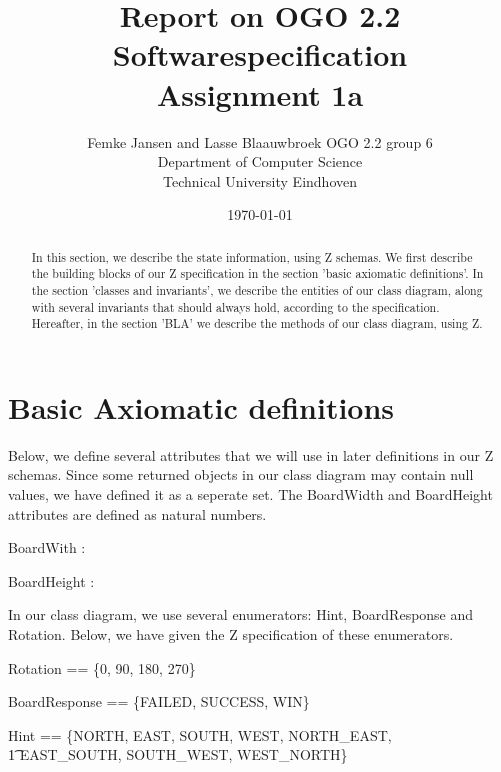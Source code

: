 \documentclass[12pt]{article}
\title{Report on OGO 2.2 Softwarespecification\\ Assignment 1a}
\author{
        Femke Jansen and Lasse Blaauwbroek OGO 2.2 group 6 \\
                Department of Computer Science\\
        Technical University Eindhoven\\
}
\date{\today}
\begin{document}
\maketitle

\begin{abstract}
In this section, we describe the state information, using Z schemas. We first describe the building blocks of our Z specification in the section 'basic axiomatic definitions'. In the section 'classes and invariants', we describe the entities of our class diagram, along with several invariants that should always hold, according to the specification. Hereafter, in the section 'BLA' we describe the methods of our class diagram, using Z.
\end{abstract}

\section{Basic Axiomatic definitions}
Below, we define several attributes that we will use in later definitions in our Z schemas. Since some returned objects in our class diagram may contain null values, we have defined it as a seperate set. The BoardWidth and BoardHeight attributes are defined as natural numbers.

\begin{axdef}
[Null]
\end{axdef}

\begin{axdef}
BoardWith : \nat
\end{axdef}

\begin{axdef}
BoardHeight : \nat
\end{axdef}

In our class diagram, we use several enumerators: Hint, BoardResponse and Rotation. Below, we have given the Z specification of these enumerators.

\begin{axdef}
Rotation == \{0, 90, 180, 270\}
\end{axdef}

\begin{axdef}
BoardResponse == \{FAILED, SUCCESS, WIN\}
\end{axdef}

\begin{axdef}
Hint == \{NORTH, EAST, SOUTH, WEST, NORTH\_EAST, \\ \t1 EAST\_SOUTH, SOUTH\_WEST, WEST\_NORTH\}
\end{axdef}
\end{document}
